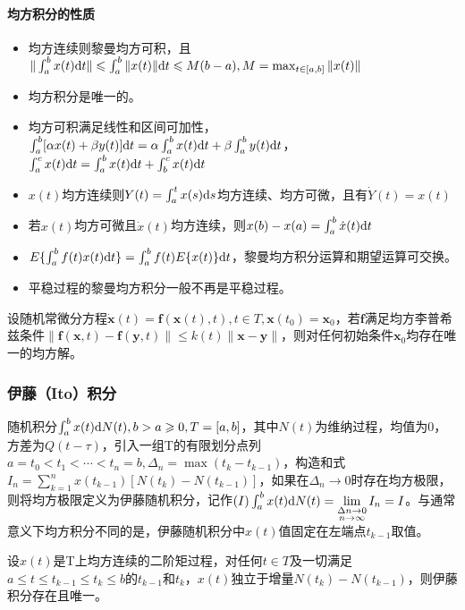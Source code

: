 \documentclass[11pt,a4paper]{ctexart}
\renewcommand{\d}{{\rm d}}
\begin{document}
            \paragraph{均方积分的性质}
            \begin{itemize}
                \item 均方连续则黎曼均方可积，且$\|\int_a^bx(t)\d t\|\leqslant\int_a^b\|x(t)\|\d t\leqslant M(b-a),M=\max_{t\in[a,b]}\|x(t)\|$
                \item 均方积分是唯一的。
                \item 均方可积满足线性和区间可加性，$\int_a^b[\alpha x(t)+\beta y(t)]\d t=\alpha\int_a^bx(t)\d t+\beta\int_a^by(t)\d t$，$\int_a^cx(t)\d t=\int_a^bx(t)\d t+\int_b^cx(t)\d t$
                \item $x(t)$均方连续则$Y(t)=\int_a^tx(s)\d s$均方连续、均方可微，且有$\dot Y(t)=x(t)$
                \item 若$x(t)$均方可微且$\dot x(t)$均方连续，则$x(b)-x(a)=\int_a^b\dot x(t)\d t$
                \item $E\{\int_a^bf(t)x(t)\d t\}=\int_a^bf(t)E\{x(t)\}\d t$，黎曼均方积分运算和期望运算可交换。
                \item 平稳过程的黎曼均方积分一般不再是平稳过程。
            \end{itemize}

            设随机常微分方程$\bm{\dot x}(t)=\bm{f}(\bm{x}(t),t),t\in T,\bm{x}(t_0)=\bm{x}_0$，若$\bm{f}$满足均方李普希兹条件$\|\bm{f}(\bm{x},t)-\bm{f}(\bm{y},t)\|\leqslant k(t)\|\bm{x}-\bm{y}\|$，则对任何初始条件$\bm{x}_0$均存在唯一的均方解。
    \subsubsection{伊藤（Ito）积分}
        随机积分$\int_a^bx(t)\d N(t),b>a\geqslant0,T=[a,b]$，其中$N(t)$为维纳过程，均值为0，方差为$Q(t-\tau)$，引入一组T的有限划分点列$a=t_0<t_1<\cdots<t_n=b,\Delta_n=\max(t_k-t_{k-1})$，构造和式$I_n=\sum_{k=1}^nx(t_{k-1})[N(t_k)-N(t_{k-1})]$，如果在$\Delta_n\rightarrow0$时存在均方极限，则将均方极限定义为伊藤随机积分，记作$(I)\int_a^bx(t)\d N(t)=\lim\limits_{\substack{\Delta n\rightarrow0\\n\rightarrow\infty}}I_n=I$。与通常意义下均方积分不同的是，伊藤随机积分中$x(t)$值固定在左端点$t_{k-1}$取值。

        设$x(t)$是T上均方连续的二阶矩过程，对任何$t\in T$及一切满足$a\leqslant t\leqslant t_{k-1}\leqslant t_k\leqslant b$的$t_{k-1}$和$t_k$，$x(t)$独立于增量$N(t_k)-N(t_{k-1})$，则伊藤积分存在且唯一。
\end{document}
